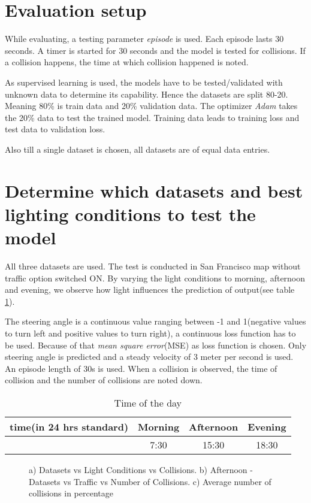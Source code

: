 \section*{Evaluation setup}
While evaluating, a testing parameter \textit{episode} is used. Each episode lasts 30 seconds. A timer is started for 30 seconds and
the  model is tested for collisions. If a collision happens, the time at which collision
happened is noted.

As supervised learning is used, the models have to be tested/validated with unknown data
to determine its capability. Hence the datasets are split 80-20. Meaning 80\% is train
data and 20\% validation data. The optimizer \textit{Adam} takes the 20\% data to test the
trained model. Training data leads to training loss and test data to validation loss.

Also till a single dataset is chosen, all datasets are of equal data entries.

\section{Determine which datasets and best lighting conditions to test the model}
\label{chapter05subsec:setup1}
All three datasets are used. The test is conducted in San Francisco map without traffic
option switched ON. By varying the light conditions to morning, afternoon and evening, we
observe how light influences the prediction of output(see table \ref{table:timeoftheday}).

The steering angle is a continuous value ranging between -1 and 1(negative values to
turn left and positive values to turn right), a continuous loss function has to be used.
Because of that \textit{mean square error}(MSE) as loss function is chosen.
Only steering angle is predicted
and a steady velocity of 3 meter per second is used. An episode length of 30s is used.
When a collision is observed, the time of collision and the number of collisions are noted down.
\begin{table}[t]
    \centering
\begin{tabular}{cccc}
    \toprule
    time(in 24 hrs standard) & Morning & Afternoon & Evening \\\midrule
      & 7:30 & 15:30 & 18:30 \\\bottomrule
\end{tabular}
\caption{Time of the day}
\label{table:timeoftheday}
\end{table}

\begin{figure}[h]
	\centering
    \def\svgwidth{0.9\textwidth}
    \caption{a) Datasets vs Light Conditions vs Collisions.
        b) Afternoon - Datasets vs Traffic vs Number of Collisions.
    c) Average number of collisions in percentage}
    \label{fig:dsvslcvstrafficAll}
\end{figure}

